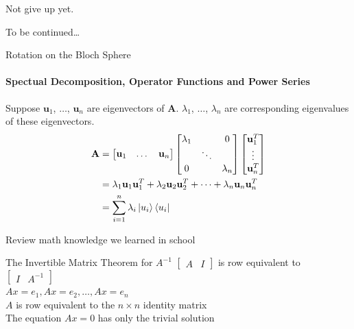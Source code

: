 \documentclass{beamer}
\begin{document}
\begin{frame}
  Not give up yet.
  \par
  To be continued\dots
\end{frame}

\begin{frame}{Rotation on the Bloch Sphere}
  \framesubtitle{Spectual Decomposition, Operator Functions and Power Series}
  {\tiny
    Suppose $\mathbf{u}_1$, $\dots$, $\mathbf{u}_n$ are eigenvectors of $\mathbf{A}$.
    $\lambda_1$, $\dots$, $\lambda_n$ are corresponding eigenvalues of these eigenvectors.
    \begin{align*}
      \mathbf{A} &= \begin{bmatrix}
                      \mathbf{u}_1 & \dots & \mathbf{u}_n
                    \end{bmatrix}
                    \begin{bmatrix}
                      \lambda_1 &  & 0 \\
                      & \ddots & \\
                      0 & &  \lambda_n
                    \end{bmatrix}
                    \begin{bmatrix}
                      \mathbf{u}^{T}_1 \\
                      \vdots \\
                      \mathbf{u}^{T}_n
                    \end{bmatrix} \\
                  &=   \lambda_1\mathbf{u}_1\mathbf{u}^{T}_1
                     + \lambda_2\mathbf{u}_2\mathbf{u}^{T}_2
                     + \dots
                     + \lambda_n\mathbf{u}_n\mathbf{u}^{T}_n \\
                     &= \sum\limits_{i=1}^n \lambda_i\ket{u_i}\bra{u_i}
    \end{align*}
  }%
\end{frame}

\begin{frame}{Review math knowledge we learned in school}
  {\tiny
    \begin{block}{The Invertible Matrix Theorem for $A^{-1}$}
      $\begin{bmatrix}A&I\end{bmatrix}$ is row equivalent to $\begin{bmatrix}I&A^{-1}\end{bmatrix}$  \\
      $Ax=e_1, Ax=e_2,  \dots, Ax=e_n$ \\
      $A$ is row equivalent to the $n{\times}n$ identity matrix \\
      The equation $Ax=0$ has only the trivial solution
    \end{block}
  }%
\end{frame}
\end{document}

